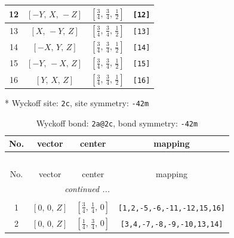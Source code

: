 \documentclass[fleqn,8pt]{jsarticle}
\begin{document}
\begin{longtable}{cccc}
12 & $\left[ - Y,\, X,\, - Z \right]$ & $\left[ \frac{3}{4},\, \frac{3}{4},\, \frac{1}{2} \right]$ & {\tt [12]} \\ \hline
13 & $\left[ X,\, - Y,\, Z \right]$ & $\left[ \frac{3}{4},\, \frac{3}{4},\, \frac{1}{2} \right]$ & {\tt [13]} \\ \hline
14 & $\left[ - X,\, Y,\, Z \right]$ & $\left[ \frac{3}{4},\, \frac{3}{4},\, \frac{1}{2} \right]$ & {\tt [14]} \\ \hline
15 & $\left[ - Y,\, - X,\, Z \right]$ & $\left[ \frac{3}{4},\, \frac{3}{4},\, \frac{1}{2} \right]$ & {\tt [15]} \\ \hline
16 & $\left[ Y,\, X,\, Z \right]$ & $\left[ \frac{3}{4},\, \frac{3}{4},\, \frac{1}{2} \right]$ & {\tt [16]} \\
\end{longtable}
* Wyckoff site: {\tt 2c}, site symmetry: {\tt -42m}
\renewcommand{\arraystretch}{1.2}
\begin{longtable}{cccc}
\caption{Wyckoff bond: {\tt 2a@2c}, bond symmetry: {\tt -42m}}
 \\
 \hline \hline
No. & vector & center & mapping \\ \hline \endfirsthead

\multicolumn{3}{l}{\tablename\ \thetable{}} \\
 \hline \hline
No. & vector & center & mapping \\ \hline \endhead

 \hline \hline
\multicolumn{3}{r}{\footnotesize\it continued ...} \\ \endfoot

 \hline \hline
\multicolumn{3}{r}{} \\ \endlastfoot

1 & $\left[ 0,\, 0,\, Z \right]$ & $\left[ \frac{3}{4},\, \frac{1}{4},\, 0 \right]$ & {\tt [1,2,-5,-6,-11,-12,15,16]} \\ \hline
2 & $\left[ 0,\, 0,\, Z \right]$ & $\left[ \frac{1}{4},\, \frac{3}{4},\, 0 \right]$ & {\tt [3,4,-7,-8,-9,-10,13,14]} \\
\end{longtable}
\renewcommand{\arraystretch}{1.2}
\end{document}
